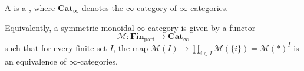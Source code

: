 \begin{definition} \label{definition:symmetric_monoidal_infinity_category}
A  is a , where $\mathbf{Cat}_\infty$ denotes the $\infty$-category of $\infty$-categories.

Equivalently, a symmetric monoidal $\infty$-category is given by a functor
\[ \mathcal{M} : \mathbf{Fin}_{\mathrm{part}} \to \mathbf{Cat}_\infty \]
such that for every finite set $I$, the map $\mathcal{M}(I) \to \prod_{i \in I} \mathcal{M}(\{i\}) = \mathcal{M}(\ast)^I$ is an equivalence of $\infty$-categories.
\end{definition}
